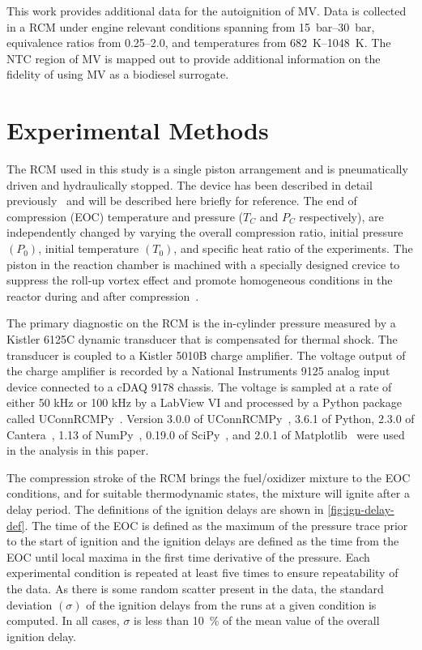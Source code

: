 \documentclass[letterpaper, review]{elsarticle}
\begin{document}
This work provides additional data for the autoignition of MV. Data is collected in a RCM under
engine relevant conditions spanning from \SIrange{15}{30}{\bar}, equivalence ratios from
\numrange{0.25}{2.0}, and temperatures from \SIrange{682}{1048}{\K}. The NTC region of MV is mapped
out to provide additional information on the fidelity of using MV as a biodiesel surrogate.

\section{Experimental Methods}\label{sec:experimental-methods}

The RCM used in this study is a single piston arrangement and is pneumatically driven and
hydraulically stopped. The device has been described in detail previously~\cite{Mittal2007a} and
will be described here briefly for reference. The end of compression (EOC) temperature and pressure
(\(T_C\) and \(P_C\) respectively), are independently changed by varying the overall compression
ratio, initial pressure \((P_0)\), initial temperature \((T_0)\), and specific heat ratio of the
experiments. The piston in the reaction chamber is machined with a specially designed crevice to
suppress the roll-up vortex effect and promote homogeneous conditions in the reactor during and
after compression~\cite{Mittal2006}.

The primary diagnostic on the RCM is the in-cylinder pressure measured by a Kistler 6125C dynamic
transducer that is compensated for thermal shock. The transducer is coupled to a Kistler 5010B
charge amplifier. The voltage output of the charge amplifier is recorded by a National Instruments
9125 analog input device connected to a cDAQ 9178 chassis. The voltage is sampled at a rate of
either 50 kHz or 100 kHz by a LabView VI and processed by a Python package called
UConnRCMPy~\cite{Weber2016a}. Version 3.0.0 of UConnRCMPy~\cite{uconnrcmpy}, 3.6.1 of Python, 2.3.0
of Cantera~\cite{cantera}, 1.13 of NumPy~\cite{vanderWalt2011}, 0.19.0 of SciPy~\cite{Jones2001},
and 2.0.1 of Matplotlib~\cite{Hunter2007} were used in the analysis in this paper.

The compression stroke of the RCM brings the fuel/oxidizer mixture to the EOC conditions, and for
suitable thermodynamic states, the mixture will ignite after a delay period. The definitions of the
ignition delays are shown in \cref{fig:ign-delay-def}. The time of the EOC is defined as the maximum
of the pressure trace prior to the start of ignition and the ignition delays are defined as the time
from the EOC until local maxima in the first time derivative of the pressure. Each experimental
condition is repeated at least five times to ensure repeatability of the data. As there is some
random scatter present in the data, the standard deviation \((\sigma)\) of the ignition delays from
the runs at a given condition is computed. In all cases, \(\sigma\) is less than \SI{10}{\percent}
of the mean value of the overall ignition delay.
\end{document}
